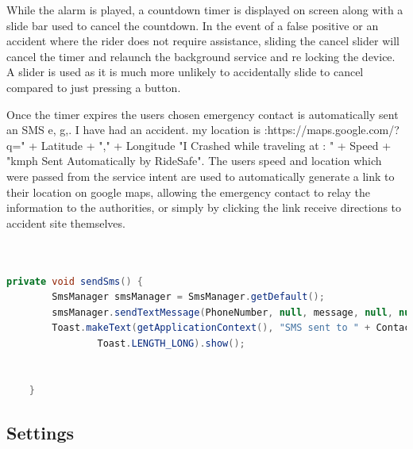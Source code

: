While the alarm is played, a countdown timer is displayed on screen along with a slide bar used to cancel the countdown. In the event of a false positive or an accident where the rider does not require assistance, sliding the cancel slider will cancel the timer and relaunch the background service and re locking the device. A slider is used as it is much more unlikely to accidentally slide to cancel compared to just pressing  a button.


Once the timer expires the users chosen emergency contact is automatically sent an SMS e, g,.  I have had an accident. my location is :https://maps.google.com/?q=" + Latitude + "," + Longitude   "I Crashed while traveling at : " + Speed + "kmph   Sent Automatically by RideSafe".   The users speed and location which were passed from the service intent are used to automatically generate a link to their location on google maps, allowing the emergency contact to relay the information to the authorities, or simply by clicking the link receive directions to accident site themselves. 

 \begin{lstlisting}[language=Java,basicstyle=\small, breaklines=true, label={lst:labell},caption={Automatic SMS Sending}]


private void sendSms() {
        SmsManager smsManager = SmsManager.getDefault();
        smsManager.sendTextMessage(PhoneNumber, null, message, null, null);
        Toast.makeText(getApplicationContext(), "SMS sent to " + ContactName,
                Toast.LENGTH_LONG).show();


    }
\end{lstlisting}


\newpage


\subsection{Settings}

